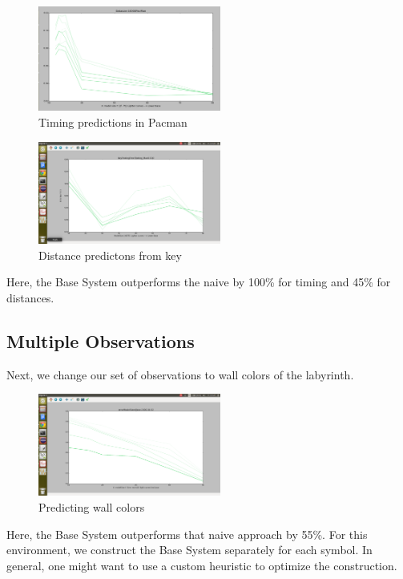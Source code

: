 \documentclass{acm_proc_article-sp}
\begin{document}
\begin{figure}[ht!]
\centering
\includegraphics[width=60mm]{lucasplots/pacman10000.png}
\caption{Timing predictions in Pacman \label{overflow}}
\end{figure}


\begin{figure}[ht!]
\centering
\includegraphics[width=60mm]{lucasplots/Distances.png}
\caption{Distance predictons from key \label{overflow}}
\end{figure}

Here, the Base System outperforms the naive by 100\% for timing and 45\% for distances.

\subsection{Multiple Observations}

Next, we change our set of observations to wall colors of the labyrinth. 

\begin{figure}[ht!]
\centering
\includegraphics[width=60mm]{lucasplots/MO:16,32.png}
\caption{Predicting wall colors \label{overflow}}
\end{figure}

Here, the Base System outperforms that naive approach by 55\%. For this environment, we construct the Base System separately for each symbol. In general, one might want to use a custom heuristic to optimize the construction.
\end{document}
